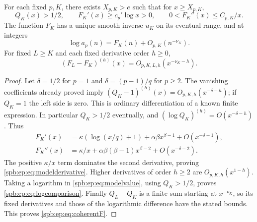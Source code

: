 \begin{lemma}\label{spb:ep:lem:model}
For each fixed $p,K$, there exists $X_{p,K}>e$ such that for
$x\ge X_{p,K}$,
\begin{equation}\label{spb:ep:eq:modelderivative}
 Q_K(x)>1/2,\qquad F_K'(x)\ge c_p'\log x>0,\qquad
             0<F_K''(x)\le C_{p,K}/x.
\end{equation}
The function $F_K$ has a unique smooth inverse $u_K$ on its eventual range,
and at integers
\begin{equation}\label{spb:ep:eq:logcomparison}
 \log a_p(n)=F_K(n)+O_{p,K}(n^{-\nu_K}).
\end{equation}
For fixed $L\ge K$ and each fixed derivative order $h\ge0$,
\begin{equation}\label{spb:ep:eq:coherentF}
 (F_L-F_K)^{(h)}(x)=O_{p,K,L,h}(x^{-\nu_K-h}).
\end{equation}
\end{lemma}
\begin{proof}
Let $\delta=1/2$ for $p=1$ and $\delta=(p-1)/q$ for $p\ge2$.
The vanishing coefficients already proved imply
$(Q_K-1)^{(h)}(x)=O_{p,K,h}(x^{-\delta-h})$;
if $Q_K=1$ the left side is zero. This is ordinary differentiation of a
known finite expression. In particular $Q_K>1/2$ eventually, and
$(\log Q_K)^{(h)}=O(x^{-\delta-h})$.
Thus
\begin{align}
 F_K'(x)&=\kappa(\log(x/q)+1)+\alpha\beta x^{\beta-1}
                                      +O(x^{-\delta-1}),\label{spb:ep:eq:Fprime}\\
 F_K''(x)&=\kappa/x+\alpha\beta(\beta-1)x^{\beta-2}
                                      +O(x^{-\delta-2}).\label{spb:ep:eq:Fsecondmodel}
\end{align}
The positive $\kappa/x$ term dominates the second derivative, proving
\eqref{spb:ep:eq:modelderivative}. Higher derivatives of order $h\ge2$ are
$O_{p,K,h}(x^{1-h})$. Taking a logarithm in \eqref{spb:ep:eq:modelvalue}, using
$Q_K>1/2$, proves \eqref{spb:ep:eq:logcomparison}.
Finally $Q_L-Q_K$ is a finite sum starting at $x^{-\nu_K}$, so its
fixed derivatives and those of the logarithmic difference have the stated
bounds. This proves \eqref{spb:ep:eq:coherentF}.
\end{proof}

